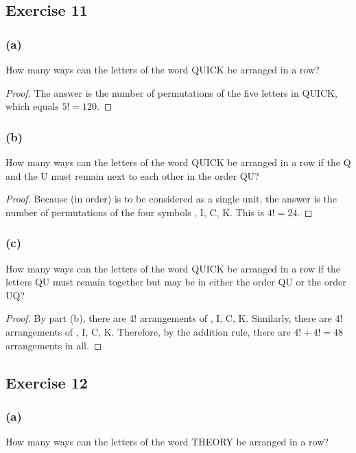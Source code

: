 \documentclass[14pt]{extarticle}
\begin{document}
\subsection{Exercise 11}
\subsubsection{(a)}
How many ways can the letters of the word QUICK be arranged in a row?

\begin{proof}
     The answer is the number of permutations of the five letters in QUICK, which equals \(5! = 120\).
\end{proof}

\subsubsection{(b)}
How many ways can the letters of the word QUICK be arranged in a row if the Q and the U must remain next to each other
in the order QU?

\begin{proof}
     Because  (in order) is to be considered as a single unit, the answer is the number of permutations of
     the four symbols , I, C, K. This is \(4! = 24\).
\end{proof}

\subsubsection{(c)}
How many ways can the letters of the word QUICK be arranged in a row if the letters QU must remain together but may be
in either the order QU or the order UQ?

\begin{proof}
     By part (b), there are 4! arrangements of , I, C, K. Similarly, there are 4! arrangements of , I,
     C, K. Therefore, by the addition rule, there are \(4! + 4! = 48\) arrangements in all.
\end{proof}

\subsection{Exercise 12}
\subsubsection{(a)}
How many ways can the letters of the word THEORY be arranged in a row?
\end{document}
